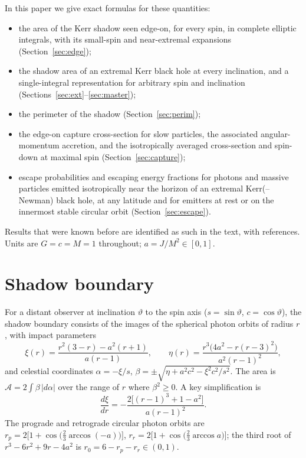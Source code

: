 \documentclass[11pt,a4paper]{article}
\theoremstyle{remark}
\numberwithin{equation}{section}
\begin{document}
In this paper we give exact formulas for these quantities:
\begin{itemize}
\item the area of the Kerr shadow seen edge-on, for every spin, in complete elliptic integrals,
with its small-spin and near-extremal expansions (Section~\ref{sec:edge});
\item the shadow area of an extremal Kerr black hole at every inclination, and a single-integral
representation for arbitrary spin and inclination (Sections~\ref{sec:ext}--\ref{sec:master});
\item the perimeter of the shadow (Section~\ref{sec:perim});
\item the edge-on capture cross-section for slow particles, the associated angular-momentum accretion,
and the isotropically averaged cross-section and spin-down at maximal spin (Section~\ref{sec:capture});
\item escape probabilities and escaping energy fractions for photons and massive particles emitted
isotropically near the horizon of an extremal Kerr(--Newman) black hole, at any latitude and for emitters
at rest or on the innermost stable circular orbit (Section~\ref{sec:escape}).
\end{itemize}
Results that were known before are identified as such in the text, with references. Units are
$G=c=M=1$ throughout; $a=J/M^2\in[0,1]$.

\section{Shadow boundary}\label{sec:setup}
For a distant observer at inclination $\vartheta$ to the spin axis ($s=\sin\vartheta$, $c=\cos\vartheta$),
the shadow boundary consists of the images of the spherical photon orbits of radius $r$, with
impact parameters~\cite{Bardeen1973,Chandrasekhar1983}
\begin{equation}
\xi(r)=\frac{r^2(3-r)-a^2(r+1)}{a(r-1)},\qquad
\eta(r)=\frac{r^3\big(4a^2-r(r-3)^2\big)}{a^2(r-1)^2},
\end{equation}
and celestial coordinates $\alpha=-\xi/s$, $\beta=\pm\sqrt{\eta+a^2c^2-\xi^2c^2/s^2}$. The area is
$\mathcal A=2\int\beta\,|d\alpha|$ over the range of $r$ where $\beta^2\ge0$. A key simplification is
\begin{equation}
\frac{d\xi}{dr}=-\frac{2\big[(r-1)^3+1-a^2\big]}{a(r-1)^2}.
\label{eq:dxi}
\end{equation}
The prograde and retrograde circular photon orbits are
$r_{p}=2\big[1+\cos\big(\tfrac23\arccos(-a)\big)\big]$, $r_{r}=2\big[1+\cos\big(\tfrac23\arccos a\big)\big]$; the third root of
$r^3-6r^2+9r-4a^2$ is $r_0=6-r_p-r_r\in(0,1)$.
\end{document}
